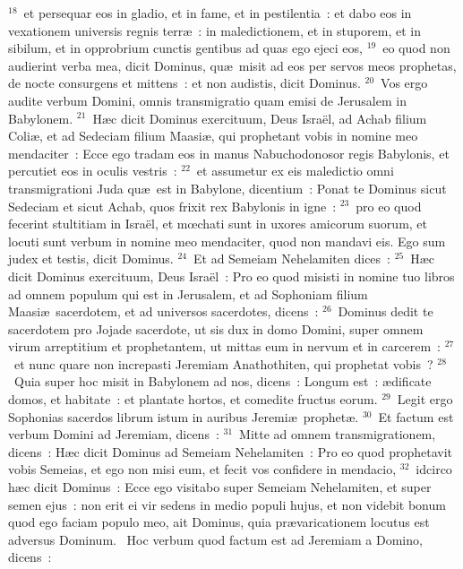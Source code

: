${}^{18}$~et persequar eos in gladio, et in fame, et in pestilentia~: et dabo eos in vexationem universis regnis terr\ae~: in maledictionem, et in stuporem, et in sibilum, et in opprobrium cunctis gentibus ad quas ego ejeci eos,
${}^{19}$~eo quod non audierint verba mea, dicit Dominus, qu\ae\ misit ad eos per servos meos prophetas, de nocte consurgens et mittens~: et non audistis, dicit Dominus.
${}^{20}$~Vos ergo audite verbum Domini, omnis transmigratio quam emisi de Jerusalem in Babylonem.
${}^{21}$~H\ae c dicit Dominus exercituum, Deus Isra\"el, ad Achab filium Coli\ae , et ad Sedeciam filium Maasi\ae , qui prophetant vobis in nomine meo mendaciter~: Ecce ego tradam eos in manus Nabuchodonosor regis Babylonis, et percutiet eos in oculis vestris~:
${}^{22}$~et assumetur ex eis maledictio omni transmigrationi Juda qu\ae\ est in Babylone, dicentium~: Ponat te Dominus sicut Sedeciam et sicut Achab, quos frixit rex Babylonis in igne~:
${}^{23}$~pro eo quod fecerint stultitiam in Isra\"el, et mœchati sunt in uxores amicorum suorum, et locuti sunt verbum in nomine meo mendaciter, quod non mandavi eis. Ego sum judex et testis, dicit Dominus.
${}^{24}$~Et ad Semeiam Nehelamiten dices~:
${}^{25}$~H\ae c dicit Dominus exercituum, Deus Isra\"el~: Pro eo quod misisti in nomine tuo libros ad omnem populum qui est in Jerusalem, et ad Sophoniam filium Maasi\ae\ sacerdotem, et ad universos sacerdotes, dicens~:
${}^{26}$~Dominus dedit te sacerdotem pro Jojade sacerdote, ut sis dux in domo Domini, super omnem virum arreptitium et prophetantem, ut mittas eum in nervum et in carcerem~:
${}^{27}$~et nunc quare non increpasti Jeremiam Anathothiten, qui prophetat vobis~?
${}^{28}$~Quia super hoc misit in Babylonem ad nos, dicens~: Longum est~: \ae dificate domos, et habitate~: et plantate hortos, et comedite fructus eorum.
${}^{29}$~Legit ergo Sophonias sacerdos librum istum in auribus Jeremi\ae\ prophet\ae .
${}^{30}$~Et factum est verbum Domini ad Jeremiam, dicens~:
${}^{31}$~Mitte ad omnem transmigrationem, dicens~: H\ae c dicit Dominus ad Semeiam Nehelamiten~: Pro eo quod prophetavit vobis Semeias, et ego non misi eum, et fecit vos confidere in mendacio,
${}^{32}$~idcirco h\ae c dicit Dominus~: Ecce ego visitabo super Semeiam Nehelamiten, et super semen ejus~: non erit ei vir sedens in medio populi hujus, et non videbit bonum quod ego faciam populo meo, ait Dominus, quia pr\ae varicationem locutus est adversus Dominum.
~\lettrine[lines=10,image=true,loversize=0.05,lraise=-0.03]{H}{}oc verbum quod factum est ad Jeremiam a Domino, dicens~:
